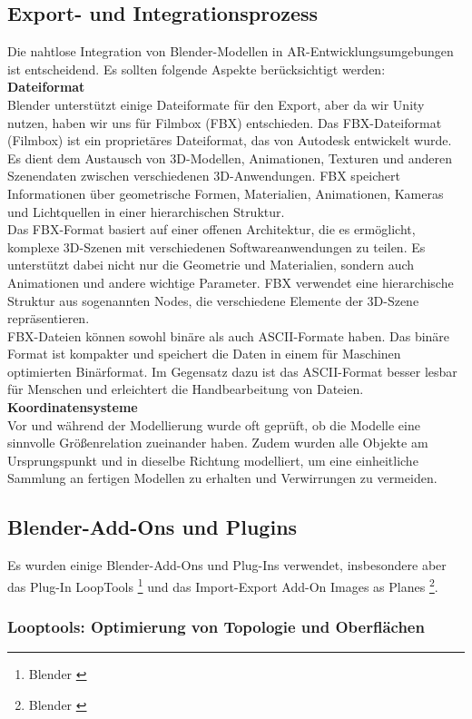 \subsection{Export- und Integrationsprozess}
Die nahtlose Integration von Blender-Modellen in AR-Entwicklungsumgebungen ist entscheidend. Es sollten folgende
Aspekte berücksichtigt werden:\\
\textbf{Dateiformat}\\
Blender unterstützt einige Dateiformate für den Export, aber da wir Unity nutzen, haben wir uns für Filmbox (FBX)
entschieden. Das FBX-Dateiformat (Filmbox) ist ein proprietäres Dateiformat, das von Autodesk entwickelt
wurde. Es dient dem Austausch von 3D-Modellen, Animationen, Texturen und anderen Szenendaten zwischen verschiedenen
3D-Anwendungen. FBX speichert Informationen über geometrische Formen, Materialien, Animationen, Kameras und
Lichtquellen in einer hierarchischen Struktur.\\
Das FBX-Format basiert auf einer offenen Architektur, die es ermöglicht, komplexe 3D-Szenen mit verschiedenen
Softwareanwendungen zu teilen. Es unterstützt dabei nicht nur die Geometrie und Materialien, sondern auch Animationen
und andere wichtige Parameter. FBX verwendet eine hierarchische Struktur aus sogenannten Nodes, die verschiedene
Elemente der 3D-Szene repräsentieren.\\
FBX-Dateien können sowohl binäre als auch ASCII-Formate haben. Das binäre Format ist kompakter und speichert die
Daten in einem für Maschinen optimierten Binärformat. Im Gegensatz dazu ist das ASCII-Format besser lesbar für
Menschen und erleichtert die Handbearbeitung von Dateien.
\textbf{Koordinatensysteme}\\
Vor und während der Modellierung wurde oft geprüft, ob die Modelle eine sinnvolle Größenrelation zueinander haben.
Zudem wurden alle Objekte am Ursprungspunkt und in dieselbe Richtung modelliert, um eine einheitliche Sammlung an
fertigen Modellen zu erhalten und Verwirrungen zu vermeiden.


\subsection{Blender-Add-Ons und Plugins}
Es wurden einige Blender-Add-Ons und Plug-Ins verwendet, insbesondere aber das Plug-In LoopTools \footnote{Blender \cite{LoopTools}}
und das Import-Export Add-On Images as Planes \footnote{Blender \cite{Images as Planes}}.

\subsubsection{Looptools: Optimierung von Topologie und Oberflächen}

